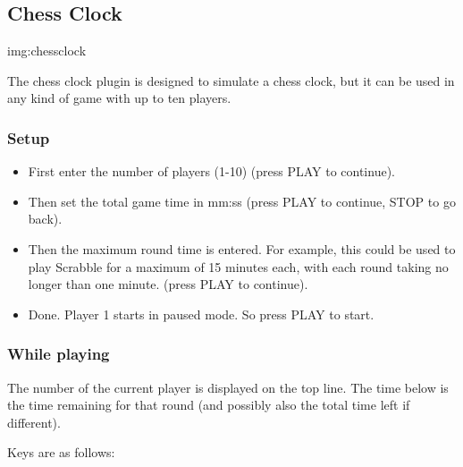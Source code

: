 \subsection{Chess Clock}
%
{img:chessclock}

The chess clock plugin is designed  to
simulate a chess clock, but it can be used
in any kind of game with up to ten players.

\subsubsection{Setup}

\begin{itemize}
\item First enter the number of players (1{}-10) (press  PLAY to
continue). 
\item Then set the total game time in mm:ss (press PLAY to continue,
STOP to go back). 
\item Then the maximum round time is entered.  For example, this could
be used  to play Scrabble for a maximum of 15 minutes each, with each
round taking no longer than one minute. (press  PLAY to continue). 
\item Done. Player 1 starts in paused mode. So press PLAY to start.
\end{itemize}

\subsubsection{While playing}
The number of the current player is displayed on the top line. The time
below is the time remaining for that round (and possibly also the total
time left if different). 

Keys are as follows:

